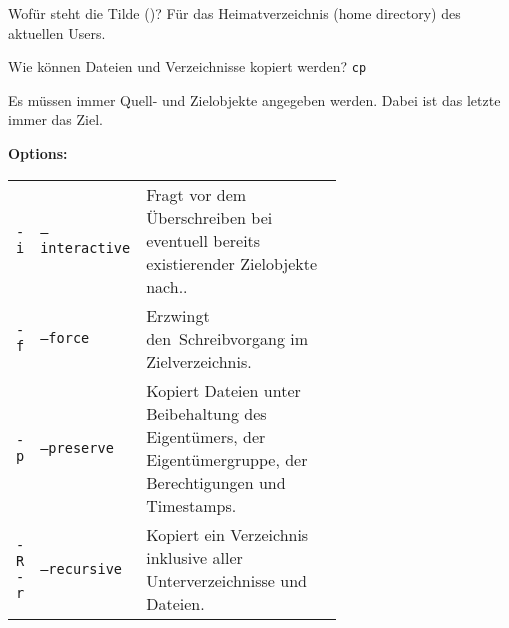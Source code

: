 \begin{flashcard}[Command]{Wofür steht die Tilde (\texttildelow)?}
	Für das Heimatverzeichnis (home directory) des aktuellen Users.
\end{flashcard}

\begin{flashcard}[Command]{Wie können Dateien und Verzeichnisse kopiert werden?}
	\texttt{cp}
	
	Es müssen immer Quell- und Zielobjekte angegeben werden. Dabei ist das letzte immer das Ziel.
	
	\textbf{Options:}
	
	\begin{tabular}{llp{0.65\linewidth}}
		\texttt{-i} & \texttt{--interactive} & Fragt vor dem Überschreiben bei eventuell bereits existierender Zielobjekte nach..\\
		\texttt{-f} & \texttt{--force} & Erzwingt den Schreibvorgang im Zielverzeichnis.\\
		\texttt{-p} & \texttt{--preserve} & Kopiert Dateien unter Beibehaltung des Eigentümers, der Eigentümergruppe, der Berechtigungen und Timestamps.\\
		\texttt{-R} \texttt{-r} & \texttt{--recursive} & Kopiert ein Verzeichnis inklusive aller Unterverzeichnisse und Dateien.
	\end{tabular}
\end{flashcard}

\begin{flashcard}[TO DO]{}	
\end{flashcard}